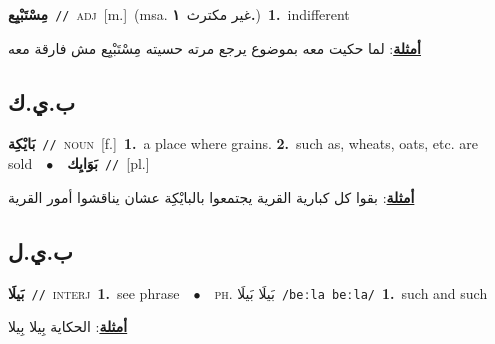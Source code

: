 \documentclass[10pt,a4paper,twoside]{article} %
\begin{document}
\begin{multicols}{2}
{\setlength\topsep{0pt}\textbf{\foreignlanguage{arabic}{مِسْتَبْيِع}}\ {\color{gray}\texttt{//}\color{black}}\ \textsc{adj}\ [m.]\ \color{gray}(msa. \foreignlanguage{arabic}{غير مكترث}~\foreignlanguage{arabic}{\textbf{١.}})\color{black}\ \textbf{1.}~indifferent\  \begin{flushright}\color{gray}\foreignlanguage{arabic}{\textbf{\underline{\foreignlanguage{arabic}{أمثلة}}}: لما حكيت معه بموضوع يرجع مرته حسيته مِسْتَبْيِع مش فارقة معه}\end{flushright}\color{black}} \vspace{2mm}

\vspace{-3mm}
\subsection*{\color{blue}\foreignlanguage{arabic}{ب.ي.ك}\color{blue}{ (ntws)}} 

{\setlength\topsep{0pt}\textbf{\foreignlanguage{arabic}{بَايْكِة}}\ {\color{gray}\texttt{//}\color{black}}\ \textsc{noun}\ [f.]\ \textbf{1.}~a place where grains.  \textbf{2.}~such as, wheats, oats, etc. are sold\ \ $\bullet$\ \ \setlength\topsep{0pt}\textbf{\foreignlanguage{arabic}{بَوَايِك}}\ {\color{gray}\texttt{//}\color{black}}\ [pl.]\  \begin{flushright}\color{gray}\foreignlanguage{arabic}{\textbf{\underline{\foreignlanguage{arabic}{أمثلة}}}: بقوا كل كبارية القرية يجتمعوا بالبايْكِة عشان يناقشوا أمور القرية}\end{flushright}\color{black}} \vspace{2mm}

\vspace{-3mm}
\subsection*{\color{blue}\foreignlanguage{arabic}{ب.ي.ل}\color{blue}{ (ntws)}} 

{\setlength\topsep{0pt}\textbf{\foreignlanguage{arabic}{بَيلَا}}\ {\color{gray}\texttt{//}\color{black}}\ \textsc{interj}\ \textbf{1.}~see phrase\ \ $\bullet$\ \ \textsc{ph.} \color{gray} \foreignlanguage{arabic}{بَيلَا بَيلَا}\color{black}\ {\color{gray}\texttt{/{\sffamily beːla beːla}/}\color{black}}\ \textbf{1.}~such and such\  \begin{flushright}\color{gray}\foreignlanguage{arabic}{\textbf{\underline{\foreignlanguage{arabic}{أمثلة}}}: الحكاية بِيلا بِيلا}\end{flushright}\color{black}} \vspace{2mm}


\end{multicols}
\end{document}
